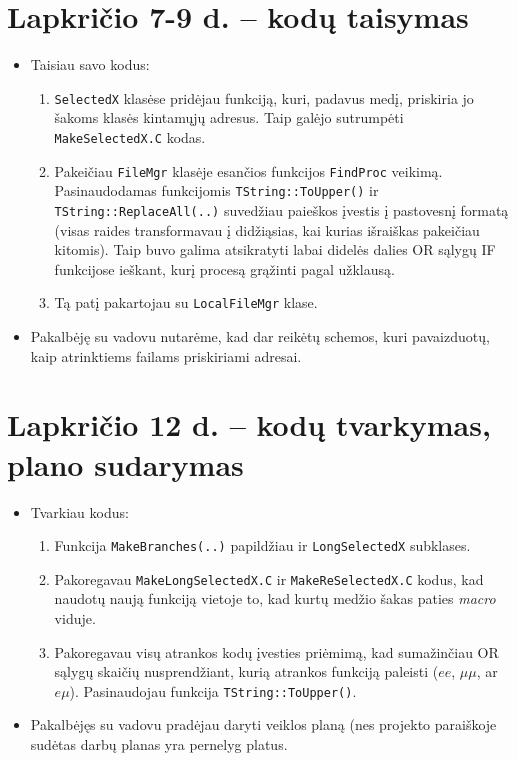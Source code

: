 \documentclass[a4paper, 12pt]{article}
\newcommand{\ttt}[1]{\texttt{#1}}
\begin{document}
\section{Lapkričio 7-9 d. -- kodų taisymas}
\begin{itemize}
	\item Taisiau savo kodus:
	\begin{enumerate}
		\item \ttt{SelectedX} klasėse pridėjau funkciją, kuri, padavus medį, priskiria jo šakoms
		klasės kintamųjų adresus. Taip galėjo sutrumpėti \ttt{MakeSelectedX.C} kodas.
		\item Pakeičiau \ttt{FileMgr} klasėje esančios funkcijos \ttt{FindProc} veikimą.
		Pasinaudodamas funkcijomis \ttt{TString::ToUpper()} ir \ttt{TString::ReplaceAll(..)}
		suvedžiau paieškos įvestis į pastovesnį formatą (visas raides transformavau į didžiąsias,
		kai kurias išraiškas pakeičiau kitomis). Taip buvo galima atsikratyti labai didelės
		dalies OR sąlygų IF funkcijose ieškant, kurį procesą grąžinti pagal užklausą.
		\item Tą patį pakartojau su \ttt{LocalFileMgr} klase.
	\end{enumerate}
	\item Pakalbėję su vadovu nutarėme, kad dar reikėtų schemos, kuri pavaizduotų, kaip
	atrinktiems failams priskiriami adresai.
\end{itemize}

\section{Lapkričio 12 d. -- kodų tvarkymas, plano sudarymas}
\begin{itemize}
	\item Tvarkiau kodus:
	\begin{enumerate}
		\item Funkcija \ttt{MakeBranches(..)} papildžiau ir \ttt{LongSelectedX} subklases.
		\item Pakoregavau \ttt{MakeLongSelectedX.C} ir \ttt{MakeReSelectedX.C} kodus, kad
		naudotų naują funkciją vietoje to, kad kurtų medžio šakas paties \textit{macro} viduje.
		\item Pakoregavau visų atrankos kodų įvesties priėmimą, kad sumažinčiau OR sąlygų
		skaičių nusprendžiant, kurią atrankos funkciją paleisti ($ee$, $\mu\mu$, ar $e\mu$).
		Pasinaudojau funkcija \ttt{TString::ToUpper()}.
	\end{enumerate}
	\item Pakalbėjęs su vadovu pradėjau daryti veiklos planą (nes projekto paraiškoje sudėtas
	darbų planas yra pernelyg platus.
\end{itemize}




\end{document}
